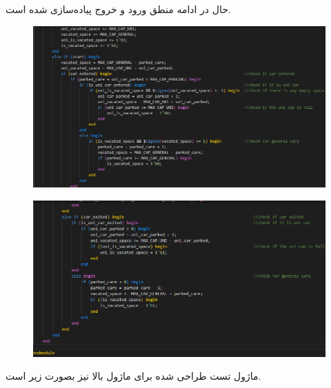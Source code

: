 \documentclass{article}
\begin{document}
\begin{enumerate}[label=\textbf{\alph*)}]
\newpage
حال در ادامه منطق ورود و خروج پیاده‌سازی شده است.
\begin{figure}[H]
    \centering
    \includegraphics[width=\textwidth]{Parking3.png}
\end{figure}
\begin{figure}[H]
    \centering
    \includegraphics[width=\textwidth]{Parking4.png}
\end{figure}

ماژول تست طراحی شده برای ماژول بالا نیز بصورت زیر است.


\end{enumerate}
\end{document}
